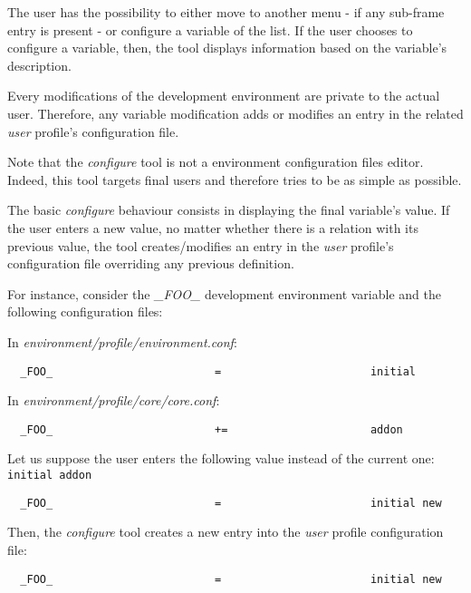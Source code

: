 The user has the possibility to either move to another menu - if any sub-frame
entry is present - or configure a variable of the list. If the user chooses
to configure a variable, then, the tool displays information based on the
variable's description.

Every modifications of the development environment are private to the actual
user. Therefore, any variable modification adds or modifies an entry in the
related \textit{user} profile's configuration file.

Note that the \textit{configure} tool is not a environment configuration
files editor. Indeed, this tool targets final users and therefore tries to
be as simple as possible.

The basic \textit{configure} behaviour consists in displaying the final
variable's value. If the user enters a new value, no matter whether there is
a relation with its previous value, the tool creates/modifies an entry in the
\textit{user} profile's configuration file overriding any previous definition.

For instance, consider the \textit{\_FOO\_} development environment variable
and the following configuration files:

In \textit{environment/profile/environment.conf}:

\begin{verbatim}
  _FOO_                         =                       initial
\end{verbatim}

In \textit{environment/profile/core/core.conf}:

\begin{verbatim}
  _FOO_                         +=                      addon
\end{verbatim}

Let us suppose the user enters the following value instead of the current
one: \verb|initial addon|

\begin{verbatim}
  _FOO_                         =                       initial new
\end{verbatim}

Then, the \textit{configure} tool creates a new entry into the \textit{user}
profile configuration file:

\begin{verbatim}
  _FOO_                         =                       initial new
\end{verbatim}

